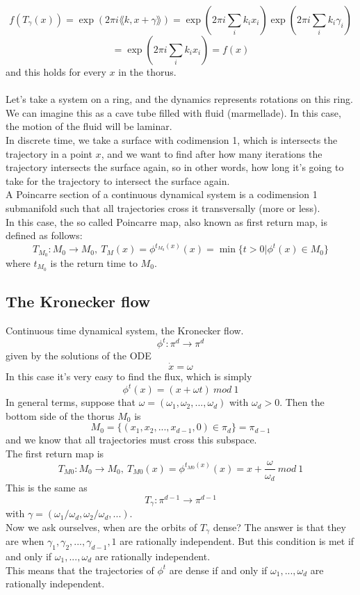 $$
	f(T_\gamma(x)) = \exp(2\pi i \lang k, x + \gamma \rang) = \exp(2\pi i \sum_i k_ix_i)\exp(2\pi i \sum_i k_i \gamma_i) 
$$
$$
	= \exp(2\pi i \sum_i k_ix_i) = f(x)
$$
and this holds for every $x$ in the thorus. \\ \\
Let's take a system on a ring, and the dynamics represents rotations on this ring. We can imagine this as a cave tube filled with fluid (marmellade). In this case, the motion of the fluid will be laminar. \\
In discrete time, we take a surface with codimension 1, which is intersects the trajectory in a point $x$, and we want to find after how many iterations the trajectory intersects the surface again, so in other words, how long it's going to take for the trajectory to intersect the surface again. \\
A Poincarre section of a continuous dynamical system is a codimension 1 submanifold such that all trajectories cross it transversally (more or less). \\
In this case, the so called Poincarre map, also known as first return map, is defined as follows:
$$
	T_{M_0}: M_0 \rightarrow M_0, \ T_M(x) = \phi^{t_{M_0}(x)}(x) = \min \{t > 0 | \phi^t(x)\in M_0\}
$$
where $t_{M_0}$ is the return time to $M_0$.

\subsection{The Kronecker flow}
Continuous time dynamical system, the Kronecker flow.
$$
	\phi^t : \pi^d \rightarrow \pi^d
$$
given by the solutions of the ODE
$$
	\dot{x} = \omega
$$
In this case it's very easy to find the flux, which is simply
$$
	\phi^t(x) =  (x + \omega t) \ mod \ 1
$$
In general terms, suppose that $\omega = (\omega_1,\omega_2,...,\omega_d)$ with $\omega_d > 0$. Then the bottom side of the thorus $M_0$ is
$$
	M_0 = \{(x_1,x_2,...,x_{d-1},0)\in \pi_d \} = \pi_{d-1}
$$
and we know that all trajectories must cross this subspace. \\
The first return map is 
$$
	T_{M0}:M_0 \rightarrow M_0, \ T_{M0}(x) = \phi^{t_{M0}(x)}(x) = x + \frac{\omega}{\omega_d} \ mod \ 1
$$
This is the same as
$$
	T_\gamma : \pi^{d-1} \rightarrow \pi^{d-1}
$$
with $\gamma=(\omega_1/\omega_d,\omega_2/\omega_d,...)$. \\
Now we ask ourselves, when are the orbits of $T_\gamma$ dense? The answer is that they are when $\gamma_1,\gamma_2,...,\gamma_{d-1},1$ are rationally independent. But this condition is met if and only if $\omega_1,...,\omega_d$ are rationally independent. \\
This means that the trajectories of $\phi^t$ are dense if and only if $\omega_1,...,\omega_d$ are rationally independent.

